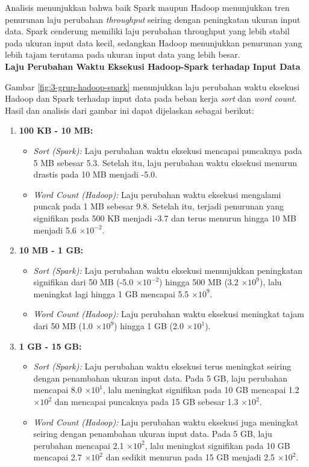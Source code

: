 Analisis menunjukkan bahwa baik Spark maupun Hadoop menunjukkan tren penurunan laju perubahan \textit{throughput} seiring dengan peningkatan ukuran input data. Spark cenderung memiliki laju perubahan throughput yang lebih stabil pada ukuran input data kecil, sedangkan Hadoop menunjukkan penurunan yang lebih tajam terutama pada ukuran input data yang lebih besar.\\

\textbf{Laju Perubahan Waktu Eksekusi Hadoop-Spark terhadap Input Data}

Gambar \ref{fig:3-grup-hadoop-spark} menunjukkan laju perubahan waktu eksekusi Hadoop dan Spark terhadap input data pada beban kerja \textit{sort} dan \textit{word count}. Hasil dan analisis dari gambar ini dapat dijelaskan sebagai berikut:

\begin{enumerate}
\item \textbf{100 KB - 10 MB:}
\begin{itemize}
\item \textit{Sort (Spark):} Laju perubahan waktu eksekusi mencapai puncaknya pada 5 MB sebesar 5.3. Setelah itu, laju perubahan waktu eksekusi menurun drastis pada 10 MB menjadi -5.0.
\item \textit{Word Count (Hadoop):} Laju perubahan waktu eksekusi mengalami puncak pada 1 MB sebesar 9.8. Setelah itu, terjadi penurunan yang signifikan pada 500 KB menjadi -3.7 dan terus menurun hingga 10 MB menjadi 5.6 $\times 10^{-2}$.
\end{itemize}
\item \textbf{10 MB - 1 GB:}
\begin{itemize}
\item \textit{Sort (Spark):} Laju perubahan waktu eksekusi menunjukkan peningkatan signifikan dari 50 MB (-5.0 $\times 10^{-2}$) hingga 500 MB (3.2 $\times 10^9$), lalu meningkat lagi hingga 1 GB mencapai 5.5 $\times 10^9$.
\item \textit{Word Count (Hadoop):} Laju perubahan waktu eksekusi meningkat tajam dari 50 MB (1.0 $\times 10^9$) hingga 1 GB (2.0 $\times 10^1$).
\end{itemize}

\item \textbf{1 GB - 15 GB:}
\begin{itemize}
\item \textit{Sort (Spark):} Laju perubahan waktu eksekusi terus meningkat seiring dengan penambahan ukuran input data. Pada 5 GB, laju perubahan mencapai 8.0 $\times 10^1$, lalu meningkat signifikan pada 10 GB mencapai 1.2 $\times 10^2$ dan mencapai puncaknya pada 15 GB sebesar 1.3 $\times 10^2$.
\item \textit{Word Count (Hadoop):} Laju perubahan waktu eksekusi juga meningkat seiring dengan penambahan ukuran input data. Pada 5 GB, laju perubahan mencapai 2.1 $\times 10^2$, lalu meningkat signifikan pada 10 GB mencapai 2.7 $\times 10^2$ dan sedikit menurun pada 15 GB menjadi 2.5 $\times 10^2$.
\end{itemize}
\end{enumerate}

